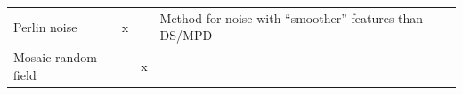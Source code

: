 \documentclass[11pt]{article}
\begin{document}
\begin{longtable}[]{@{}llllll@{}}
\begin{minipage}[t]{0.35\columnwidth}\raggedright
Perlin noise\strut
\end{minipage} & \begin{minipage}[t]{0.07\columnwidth}\raggedright
x\strut
\end{minipage} & \begin{minipage}[t]{0.05\columnwidth}\raggedright
\strut
\end{minipage} & \begin{minipage}[t]{0.33\columnwidth}\raggedright
Method for noise with ``smoother'' features than DS/MPD\strut
\end{minipage} & \begin{minipage}[t]{0.02\columnwidth}\raggedright
\strut
\end{minipage} & \begin{minipage}[t]{0.02\columnwidth}\raggedright
\strut
\end{minipage}\tabularnewline
\begin{minipage}[t]{0.35\columnwidth}\raggedright
Mosaic random field\strut
\end{minipage} & \begin{minipage}[t]{0.07\columnwidth}\raggedright
\strut
\end{minipage} & \begin{minipage}[t]{0.05\columnwidth}\raggedright
x\strut
\end{minipage} & \begin{minipage}[t]{0.33\columnwidth}\raggedright
\strut
\end{minipage} & \begin{minipage}[t]{0.02\columnwidth}\raggedright
\strut
\end{minipage} & \begin{minipage}[t]{0.02\columnwidth}\raggedright
\strut
\end{minipage}\tabularnewline
\bottomrule
\end{longtable}
\end{document}
